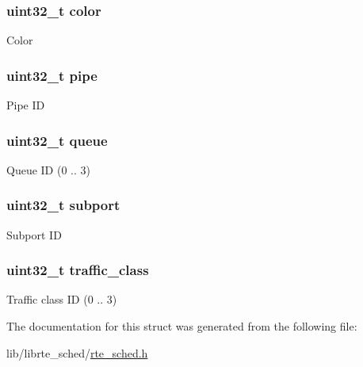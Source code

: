 \subsubsection[{color}]{\setlength{\rightskip}{0pt plus 5cm}uint32\+\_\+t color}\label{structrte__sched__port__hierarchy_a66b2ef8398a8bbb0f5816f22a7b138da}
Color \hypertarget{structrte__sched__port__hierarchy_aab9d6c721df5d1e7f16a62775d4b8a27}{}
\subsubsection[{pipe}]{\setlength{\rightskip}{0pt plus 5cm}uint32\+\_\+t pipe}\label{structrte__sched__port__hierarchy_aab9d6c721df5d1e7f16a62775d4b8a27}
Pipe I\+D \hypertarget{structrte__sched__port__hierarchy_a2b1b322d05920512d14aa65fc6055207}{}
\subsubsection[{queue}]{\setlength{\rightskip}{0pt plus 5cm}uint32\+\_\+t queue}\label{structrte__sched__port__hierarchy_a2b1b322d05920512d14aa65fc6055207}
Queue I\+D (0 .. 3) \hypertarget{structrte__sched__port__hierarchy_a33315241553c200d0c73b47c82a84313}{}
\subsubsection[{subport}]{\setlength{\rightskip}{0pt plus 5cm}uint32\+\_\+t subport}\label{structrte__sched__port__hierarchy_a33315241553c200d0c73b47c82a84313}
Subport I\+D \hypertarget{structrte__sched__port__hierarchy_a3a5f512c3cff981dd7ded965bd3a7530}{}
\subsubsection[{traffic\+\_\+class}]{\setlength{\rightskip}{0pt plus 5cm}uint32\+\_\+t traffic\+\_\+class}\label{structrte__sched__port__hierarchy_a3a5f512c3cff981dd7ded965bd3a7530}
Traffic class I\+D (0 .. 3) 

The documentation for this struct was generated from the following file\+:\begin{DoxyCompactItemize}
\item 
lib/librte\+\_\+sched/\hyperlink{rte__sched_8h}{rte\+\_\+sched.\+h}\end{DoxyCompactItemize}
